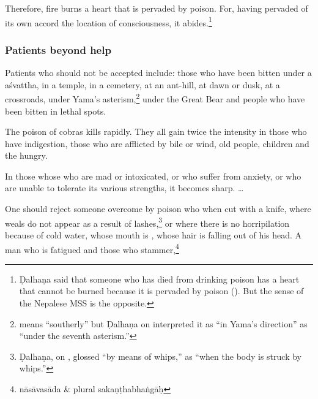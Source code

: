 \begin{translation}[resume]
\item[37]

Therefore, fire burns a heart that is pervaded by poison. For, having pervaded
of its own accord  the location of consciousness, it abides.\footnote{Ḍalhaṇa
    said that someone who has died from drinking poison has a heart that cannot
    be burned because it is pervaded by poison ().
    But the sense of the Nepalese MSS is the opposite.}

\subsubsection{Patients beyond help}

\item[38] Patients who should not be accepted include: those who have been
bitten under a \gls{aśvattha}, in a temple, in a cemetery, at an ant-hill, at
dawn or dusk, at a crossroads, under Yama's asterism,\footnote{ means
“southerly” but Ḍalhaṇa on  interpreted it as “in Yama's
direction” as “under the seventh asterism.”} under the Great Bear and people
who have been bitten in lethal spots.

\item[39]

The poison of cobras kills rapidly.  They all gain twice the intensity in
those who have indigestion, those who are afflicted by bile or wind, old
people, children and the hungry.




\item[39.1]

In those whose who are mad or intoxicated, or who suffer from anxiety, or who
are unable to tolerate its various strengths, it becomes sharp.
\dag \ldots

\item[39.2]

\item [3.40cd--3.41]

One should reject someone overcome by poison who  when
cut with a knife, where weals do not appear as a result of
lashes,\footnote{Ḍalhaṇa, on , glossed  “by
    means of whips,” as “when the body is struck by whips.”} or where there is no
    horripilation because of cold water, whose mouth is , whose hair
    is falling out of his head.  A man who is fatigued and those who 
    stammer,\footnote{nāsāvasāda \& plural sakaṇṭhabhaṅgāḥ}


\end{translation}
